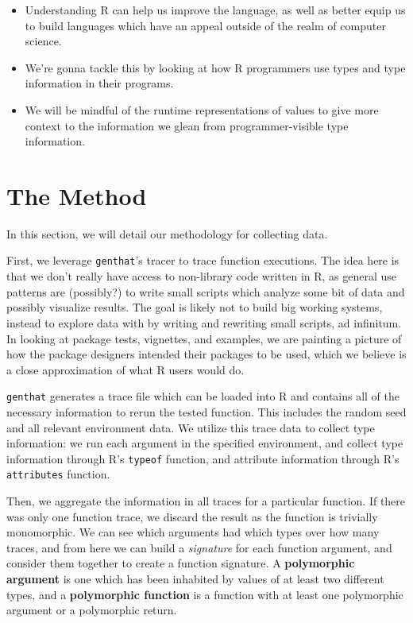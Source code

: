 \documentclass[acmsmall,10pt,review,anonymous]{acmart}\settopmatter{printfolios=true,printccs=false,printacmref=false}
\begin{document}
\begin{itemize}
    \item Understanding R can help us improve the language, as well as better equip us to build languages which have an appeal outside of the realm of computer science.
    \item We're gonna tackle this by looking at how R programmers use types and type information in their programs.
    \item We will be mindful of the runtime representations of values to give more context to the information we glean from programmer-visible type information.
\end{itemize}

%
%
%
%
%
%
\section{The Method}

In this section, we will detail our methodology for collecting data.

First, we leverage {\tt genthat}'s tracer to trace function executions.
The idea here is that we don't really have access to non-library code written in R, as general use patterns are (possibly?) to write small scripts which analyze some bit of data and possibly visualize results.
The goal is likely not to build big working systems, instead to explore data with by writing and rewriting small scripts, ad infinitum.
In looking at package tests, vignettes, and examples, we are painting a picture of how the package designers intended their packages to be used, which we believe is a close approximation of what R users would do.

{\tt genthat} generates a trace file which can be loaded into R and contains all of the necessary information to rerun the tested function.
This includes the random seed and all relevant environment data.
We utilize this trace data to collect type information:
we run each argument in the specified environment, and collect type information through R's {\tt typeof} function, and attribute information through R's {\tt attributes} function.

Then, we aggregate the information in all traces for a particular function. 
If there was only one function trace, we discard the result as the function is trivially monomorphic.
We can see which arguments had which types over how many traces, and from here we can build a \textit{signature} for each function argument, and consider them together to create a function signature.
A \textbf{polymorphic argument} is one which has been inhabited by values of at least two different types, and a \textbf{polymorphic function} is a function with at least one polymorphic argument or a polymorphic return.
\end{document}
